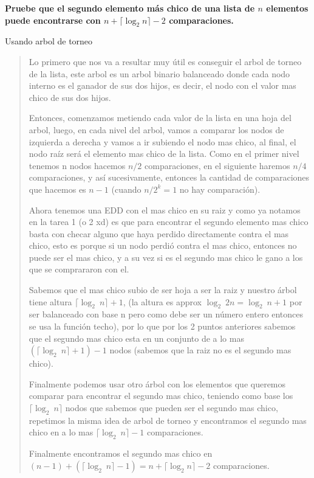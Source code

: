 \textbf{Pruebe que el segundo elemento más chico de una lista de $n$ elementos puede encontrarse con $n + \lceil \log_2 n \rceil - 2$ comparaciones.}\vspace{.2cm}

\textcolor{bibi}{Usando arbol de torneo}
\begin{quote}
    Lo primero que nos va a resultar muy útil es conseguir el arbol de torneo de la lista, este arbol es un arbol binario balanceado donde cada nodo interno es el ganador de sus dos hijos, es decir, el nodo con el valor mas chico de sus dos hijos. \vspace{.2cm}
    
    Entonces, comenzamos metiendo cada valor de la lista en una hoja del arbol, luego, en cada nivel del arbol, vamos a comparar los nodos de izquierda a derecha y vamos a ir subiendo el nodo mas chico, al final, el nodo raíz será el elemento mas chico de la lista. Como en el primer nivel tenemos n nodos hacemos $n/2$ comparaciones, en el siguiente haremos $n/4$ comparaciones, y así sucesivamente, entonces la cantidad de comparaciones que hacemos es $n - 1$ (cuando $n/2^k=1$ no hay comparación). \vspace{.2cm}

    Ahora tenemos una EDD con el mas chico en su raiz y como ya notamos en la tarea 1 (o 2 xd) es que para encontrar el segundo elemento mas chico basta con checar alguno que haya perdido directamente contra el mas chico, esto es porque si un nodo perdió contra el mas chico, entonces no puede ser el mas chico, y a su vez si es el segundo mas chico le gano a los que se comprararon con el.\vspace{.2cm}

    Sabemos que el mas chico subio de ser hoja a ser la raiz y nuestro árbol tiene altura $\lceil \log_2 \ n \rceil+1$, (la altura es approx $\log_2 \ 2n = \log_2 \ n +1 $ por ser balanceado con base n pero como debe ser un número entero entonces se usa la función techo), por lo que por los 2 puntos anteriores sabemos que el segundo mas chico esta en un conjunto de a lo mas $(\lceil \log_2 \ n \rceil+1) -1$ nodos (sabemos que la raiz no es el segundo mas chico). \vspace{.2cm}

    Finalmente podemos usar otro árbol con los elementos que queremos comparar para encontrar el segundo mas chico, teniendo como base los $\lceil \log_2 \ n \rceil$ nodos que sabemos que pueden ser el segundo mas chico, repetimos la misma idea de arbol de torneo y encontramos el segundo mas chico en a lo mas $\lceil \log_2 \ n \rceil-1$ comparaciones. \vspace{.2cm}

    Finalmente encontramos el segundo mas chico en $(n-1)+(\lceil \log_2 \ n \rceil-1) = n + \lceil \log_2 n \rceil - 2$ comparaciones.
\end{quote}